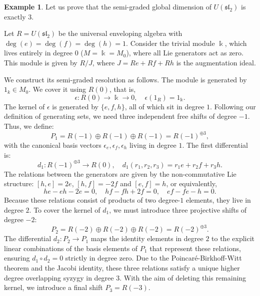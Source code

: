 \documentclass[reqno]{amsart}
\theoremstyle{definition}
\newtheorem{example}[theorem]{Example}
\theoremstyle{remark}
\numberwithin{equation}{section}
\begin{document}
\begin{example}
Let us prove that the semi-graded global dimension of $U(\mathfrak{sl}_2)$ is exactly $3$.


Let $R = U(\mathfrak{sl}_2)$ be the universal enveloping algebra with $\deg(e)=\deg(f)=\deg(h)=1$. Consider the trivial module $\Bbbk$, which lives entirely in degree $0$ ($M = \Bbbk = M_0$), where all Lie generators act as zero. This module is given by $R / J$, where $J = R e + R f + R h$ is the augmentation ideal.

We construct its semi-graded resolution as follows.
The module is generated by $1_k \in M_0$. We cover it using $R(0)$, that is,
    \[
    \epsilon: R(0) \longrightarrow \Bbbk \longrightarrow 0, \quad \epsilon(1_R) = 1_{\Bbbk}.
    \]
The kernel of $\epsilon$ is generated by $\{e, f, h\}$, all of which sit in degree $1$. Following our definition of generating sets, we need three independent free shifts of degree $-1$. Thus, we define:
    \[
    P_1 = R(-1) \oplus R(-1) \oplus R(-1) = R(-1)^{\oplus 3},
    \]
    with the canonical basis vectors $\epsilon_e, \epsilon_f, \epsilon_h$ living in degree $1$. The first differential is:
    \[
    d_1: R(-1)^{\oplus 3} \longrightarrow R(0), \quad d_1(r_1, r_2, r_3) = r_1 e + r_2 f + r_3 h.
    \]
The relations between the generators are given by the non-commutative Lie structure: $[h,e]=2e$, $[h,f]=-2f$ and $[e,f]=h$, or equivalently, 
    \[
    he - eh - 2e = 0, \quad hf - fh + 2f = 0, \quad ef - fe - h = 0.
    \]
    Because these relations consist of products of two degree-$1$ elements, they live in degree $2$. To cover the kernel of $d_1$, we must introduce three projective shifts of degree $-2$:
    \[
    P_2 = R(-2) \oplus R(-2) \oplus R(-2) = R(-2)^{\oplus 3}.
    \]
    The differential $d_2: P_2 \to P_1$ maps the identity elements in degree $2$ to the explicit linear combinations of the basis elements of $P_1$ that represent these relations, ensuring $d_1 \circ d_2 = 0$ strictly in degree zero. Due to the Poincar\'e-Birkhoff-Witt theorem and the Jacobi identity, these three relations satisfy a unique higher degree overlapping syzygy in degree $3$. With the aim of deleting this remaining kernel, we introduce a final shift $  P_3 = R(-3)$.


\end{example}
\end{document}
